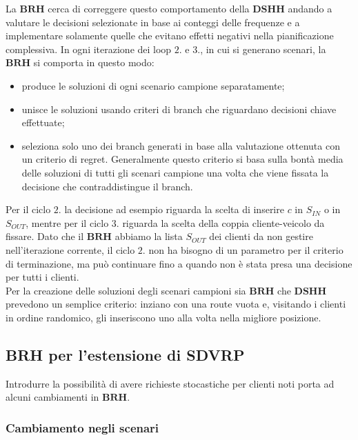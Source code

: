 \documentclass[
]{article}
\providecommand{\tightlist}{%
  \setlength{\itemsep}{0pt}\setlength{\parskip}{0pt}}
\begin{document}
La {\(\mathbf{BRH}\)} cerca di correggere questo comportamento della
{\(\mathbf{DSHH}\)} andando a valutare le decisioni selezionate in base
ai conteggi delle frequenze e a implementare solamente quelle che
evitano effetti negativi nella pianificazione complessiva. In ogni
iterazione dei loop {\(2.\)} e {\(3.\)}, in cui si generano scenari, la
{\(\mathbf{BRH}\)} si comporta in questo modo:

\begin{itemize}
\tightlist
\item
  produce le soluzioni di ogni scenario campione separatamente;
\item
  unisce le soluzioni usando criteri di branch che riguardano decisioni
  chiave effettuate;
\item
  seleziona solo uno dei branch generati in base alla valutazione
  ottenuta con un criterio di regret. Generalmente questo criterio si
  basa sulla bontà media delle soluzioni di tutti gli scenari campione
  una volta che viene fissata la decisione che contraddistingue il
  branch.
\end{itemize}

Per il ciclo {\(2.\)} la decisione ad esempio riguarda la scelta di
inserire {\(c\)} in {\(S_{IN}\)} o in {\(S_{OUT}\)}, mentre per il ciclo
{\(3.\)} riguarda la scelta della coppia cliente-veicolo da fissare.
Dato che il {\(\mathbf{BRH}\)} abbiamo la lista {\(S_{OUT}\)} dei
clienti da non gestire nell'iterazione corrente, il ciclo {\(2.\)} non
ha bisogno di un parametro per il criterio di terminazione, ma può
continuare fino a quando non è stata presa una decisione per tutti i
clienti.\\
Per la creazione delle soluzioni degli scenari campioni sia
{\(\mathbf{BRH}\)} che {\(\mathbf{DSHH}\)} prevedono un semplice
criterio: inziano con una route vuota e, visitando i clienti in ordine
randomico, gli inseriscono uno alla volta nella migliore posizione.

\hypertarget{mathbfbrh-per-lestensione-di-mathbfsdvrp}{%
\subsection{\texorpdfstring{BRH per l'estensione di
SDVRP}{BRH per l'estensione di SDVRP}}\label{mathbfbrh-per-lestensione-di-mathbfsdvrp}}

Introdurre la possibilità di avere richieste stocastiche per clienti
noti porta ad alcuni cambiamenti in {\(\mathbf{BRH}\)}.

\hypertarget{cambiamento-negli-scenari}{%
\subsubsection{Cambiamento negli
scenari}\label{cambiamento-negli-scenari}}
\end{document}
